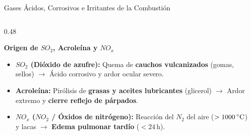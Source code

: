 \begin{frame}{Gases Ácidos, Corrosivos e Irritantes de la Combustión}
\begin{columns}[T]
    \begin{column}{0.48\textwidth}
      \begin{block}{\textbf{Origen de $SO_2$, Acroleína y $NO_x$}}
        \vspace{0.05cm}
        \begin{itemize}
          \scriptsize
          \setlength{\itemsep}{3pt}
          \item \textbf{$SO_2$ (Dióxido de azufre):} Quema de \textbf{cauchos vulcanizados} (gomas, sellos) $\rightarrow$ Ácido corrosivo y ardor ocular severo.
          \item \textbf{Acroleína:} Pirólisis de \textbf{grasas y aceites lubricantes} (glicerol) $\rightarrow$ Ardor extremo y \textbf{cierre reflejo de párpados}.
          \item \textbf{$NO_x$ ($NO_2$ / Óxidos de nitrógeno):} Reacción del $N_2$ del aire ($>1000\,^\circ\mathrm{C}$) y lacas $\rightarrow$ \textbf{Edema pulmonar tardío} ($<24\,\mathrm{h}$).
        \end{itemize}
      \end{block}
      \vspace{0.15cm}
      \centering
    \end{column}
  \end{columns}
\end{frame}

